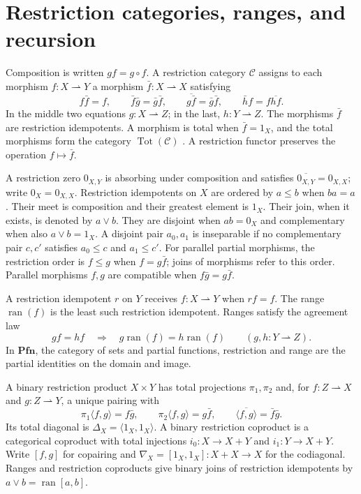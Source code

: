 \documentclass[11pt]{article}
\theoremstyle{definition}\newtheorem{definition}[theorem]{Definition}
\newcommand{\Pfn}{\mathbf{Pfn}}
\newcommand{\Tot}{\operatorname{Tot}}
\newcommand{\ran}{\operatorname{ran}}
\begin{document}
\section{Restriction categories, ranges, and recursion}
Composition is written $gf=g\circ f$. A restriction category $\mathcal C$ assigns
to each morphism $f:X\rightharpoonup Y$ a morphism
$\bar f:X\rightharpoonup X$ satisfying
\[
 f\bar f=f,\qquad
 \bar f\bar g=\bar g\bar f,\qquad
 \overline{g\bar f}=\bar g\bar f,\qquad
 \bar h f=f\overline{hf}.
\]
In the middle two equations $g:X\rightharpoonup Z$; in the last,
$h:Y\rightharpoonup Z$. The morphisms $\bar f$ are restriction
idempotents. A morphism is total when $\bar f=1_X$, and the total
morphisms form the category $\Tot(\mathcal C)$
\cite{CockettLack}. A restriction functor preserves the operation
$f\mapsto\bar f$.

A restriction zero $0_{X,Y}$ is absorbing under composition and
satisfies $\overline{0_{X,Y}}=0_{X,X}$; write $0_X=0_{X,X}$.
Restriction idempotents on $X$ are ordered by $a\le b$ when $ba=a$.
Their meet is composition and their greatest element is $1_X$.
Their join, when it exists, is denoted by $a\vee b$. They are
disjoint when $ab=0_X$ and complementary when also $a\vee b=1_X$.
A disjoint pair $a_0,a_1$ is inseparable if no complementary pair
$c,c'$ satisfies $a_0\le c$ and $a_1\le c'$.
For parallel partial morphisms, the restriction order is
$f\le g$ when $f=g\bar f$; joins of morphisms refer to this order.
Parallel morphisms $f,g$ are compatible when $f\bar g=g\bar f$.

A restriction idempotent $r$ on $Y$ receives
$f:X\rightharpoonup Y$ when $rf=f$. The range $\ran(f)$ is the
least such restriction idempotent. Ranges satisfy the agreement law
\[
 gf=hf\quad\Longrightarrow\quad
 g\ran(f)=h\ran(f)
 \qquad(g,h:Y\rightharpoonup Z).
\]
In $\Pfn$, the category of sets and partial functions, restriction
and range are the partial identities on the domain and image.

A binary restriction product $X\times Y$ has total projections
$\pi_1,\pi_2$ and, for $f:Z\rightharpoonup X$ and
$g:Z\rightharpoonup Y$, a unique pairing with
\[
 \pi_1\langle f,g\rangle=f\bar g,\qquad
 \pi_2\langle f,g\rangle=g\bar f,\qquad
 \overline{\langle f,g\rangle}=\bar f\bar g.
\]
Its total diagonal is $\Delta_X=\langle1_X,1_X\rangle$.
A binary restriction coproduct is a categorical coproduct with total
injections $i_0:X\to X+Y$ and $i_1:Y\to X+Y$. Write $[f,g]$ for
copairing and $\nabla_X=[1_X,1_X]:X+X\to X$ for the codiagonal.
Ranges and restriction coproducts give binary joins of restriction
idempotents by $a\vee b=\ran[a,b]$.
\end{document}
